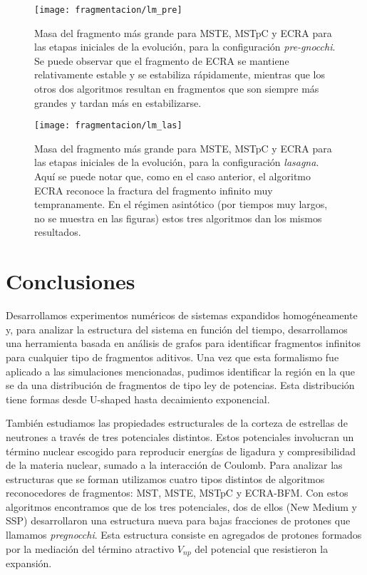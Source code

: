\begin{figure}[H]  \centering
  \texttt{[image: fragmentacion/lm\_pre]}
  \caption{Masa del fragmento más grande para MSTE, MSTpC y ECRA para las etapas iniciales de la evolución, para la configuración \emph{pre-gnocchi}.
    Se puede observar que el fragmento de ECRA se mantiene relativamente estable y se estabiliza rápidamente, mientras que los otros dos algoritmos resultan en fragmentos que son siempre más grandes y tardan más en estabilizarse.}
\label{fig:lm_pre}
\end{figure}

\begin{figure}[H]  \centering
  \texttt{[image: fragmentacion/lm\_las]}
  \caption{Masa del fragmento más grande para MSTE, MSTpC y ECRA para las etapas iniciales de la evolución, para la configuración \emph{lasagna}.
    Aquí se puede notar que, como en el caso anterior, el algoritmo ECRA reconoce la fractura del fragmento infinito muy tempranamente.
    En el régimen asintótico (por tiempos muy largos, no se muestra en las figuras) estos tres algoritmos dan los mismos resultados.}
\label{fig:lm_las}
\end{figure}


\section{Conclusiones}\label{sc:conc}


Desarrollamos experimentos numéricos de sistemas expandidos homogéneamente  y, para analizar la estructura del sistema en función del tiempo, desarrollamos una herramienta basada en análisis de grafos para identificar fragmentos infinitos para cualquier tipo de fragmentos aditivos.
Una vez que esta formalismo fue aplicado a las simulaciones mencionadas, pudimos identificar la región en la que se da una distribución de fragmentos de tipo ley de potencias.
Esta distribución tiene formas desde U-shaped hasta decaimiento exponencial.

También estudiamos las propiedades estructurales de la corteza de estrellas de neutrones a través de tres potenciales distintos.
Estos potenciales involucran un término nuclear escogido para reproducir energías de ligadura y compresibilidad de la materia nuclear, sumado a la interacción de Coulomb.
Para analizar las estructuras que se forman utilizamos cuatro tipos distintos de algoritmos reconocedores de fragmentos: MST, MSTE, MSTpC y ECRA-BFM.
Con estos algoritmos encontramos que de los tres potenciales, dos de ellos (New Medium y SSP) desarrollaron una estructura nueva para bajas fracciones de protones que llamamos \emph{pregnocchi}.
Esta estructura consiste en agregados de protones formados por la mediación del término atractivo $V_{np}$ del potencial que resistieron la expansión.

